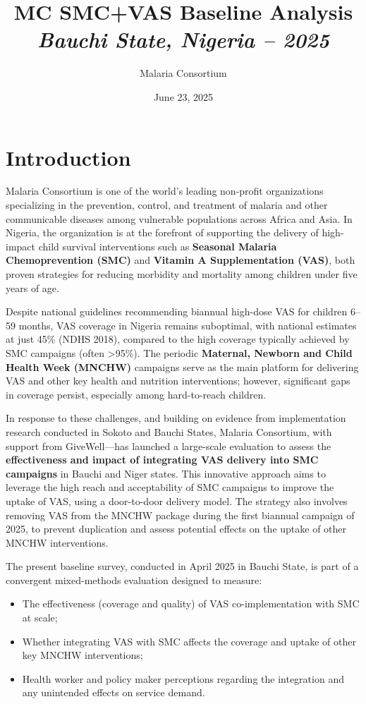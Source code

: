 \documentclass[
  11pt,
]{report}
\title{\textbf{MC SMC+VAS Baseline Analysis}\\
\emph{Bauchi State, Nigeria -- 2025}}
\author{Malaria Consortium}
\date{June 23, 2025}
\providecommand{\tightlist}{%
  \setlength{\itemsep}{0pt}\setlength{\parskip}{0pt}}
\begin{document}
\maketitle

{
\setcounter{tocdepth}{1}
\tableofcontents
}
\chapter{Introduction}\label{introduction}

Malaria Consortium is one of the world's leading non-profit
organizations specializing in the prevention, control, and treatment of
malaria and other communicable diseases among vulnerable populations
across Africa and Asia. In Nigeria, the organization is at the forefront
of supporting the delivery of high-impact child survival interventions
such as \textbf{Seasonal Malaria Chemoprevention (SMC)} and
\textbf{Vitamin A Supplementation (VAS)}, both proven strategies for
reducing morbidity and mortality among children under five years of age.

Despite national guidelines recommending biannual high-dose VAS for
children 6--59 months, VAS coverage in Nigeria remains suboptimal, with
national estimates at just 45\% (NDHS 2018), compared to the high
coverage typically achieved by SMC campaigns (often \textgreater95\%).
The periodic \textbf{Maternal, Newborn and Child Health Week (MNCHW)}
campaigns serve as the main platform for delivering VAS and other key
health and nutrition interventions; however, significant gaps in
coverage persist, especially among hard-to-reach children.

In response to these challenges, and building on evidence from
implementation research conducted in Sokoto and Bauchi States, Malaria
Consortium, with support from GiveWell---has launched a large-scale
evaluation to assess the \textbf{effectiveness and impact of integrating
VAS delivery into SMC campaigns} in Bauchi and Niger states. This
innovative approach aims to leverage the high reach and acceptability of
SMC campaigns to improve the uptake of VAS, using a door-to-door
delivery model. The strategy also involves removing VAS from the MNCHW
package during the first biannual campaign of 2025, to prevent
duplication and assess potential effects on the uptake of other MNCHW
interventions.

The present baseline survey, conducted in April 2025 in Bauchi State, is
part of a convergent mixed-methods evaluation designed to measure:

\begin{itemize}
\tightlist
\item
  The effectiveness (coverage and quality) of VAS co-implementation with
  SMC at scale;
\item
  Whether integrating VAS with SMC affects the coverage and uptake of
  other key MNCHW interventions;
\item
  Health worker and policy maker perceptions regarding the integration
  and any unintended effects on service demand.
\end{itemize}
\end{document}
